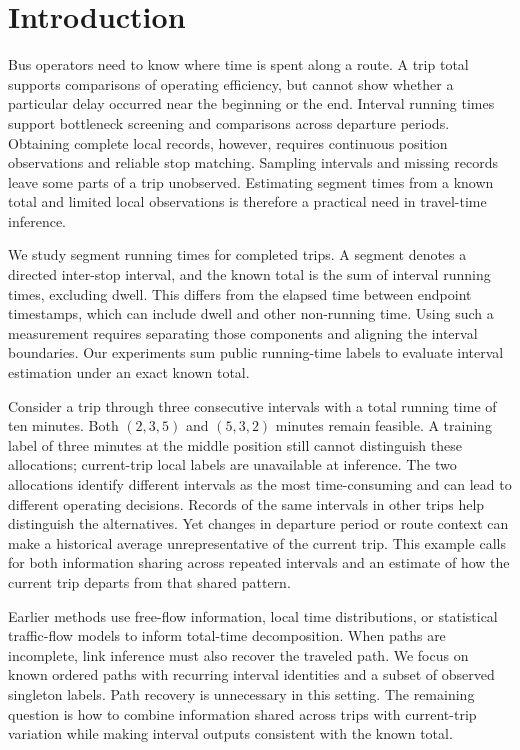 \section{Introduction}
Bus operators need to know where time is spent along a route. A trip total supports comparisons of operating efficiency, but cannot show whether a particular delay occurred near the beginning or the end. Interval running times support bottleneck screening and comparisons across departure periods. Obtaining complete local records, however, requires continuous position observations and reliable stop matching. Sampling intervals and missing records leave some parts of a trip unobserved. Estimating segment times from a known total and limited local observations is therefore a practical need in travel-time inference\cite{hellinga2008,hofleitner2011,yin2015entryexit}.

We study segment running times for completed trips. A segment denotes a directed inter-stop interval, and the known total is the sum of interval running times, excluding dwell. This differs from the elapsed time between endpoint timestamps, which can include dwell and other non-running time. Using such a measurement requires separating those components and aligning the interval boundaries. Our experiments sum public running-time labels to evaluate interval estimation under an exact known total.

Consider a trip through three consecutive intervals with a total running time of ten minutes. Both $(2,3,5)$ and $(5,3,2)$ minutes remain feasible. A training label of three minutes at the middle position still cannot distinguish these allocations; current-trip local labels are unavailable at inference. The two allocations identify different intervals as the most time-consuming and can lead to different operating decisions. Records of the same intervals in other trips help distinguish the alternatives. Yet changes in departure period or route context can make a historical average unrepresentative of the current trip. This example calls for both information sharing across repeated intervals and an estimate of how the current trip departs from that shared pattern.

Earlier methods use free-flow information, local time distributions, or statistical traffic-flow models to inform total-time decomposition\cite{hellinga2008,hofleitner2011}. When paths are incomplete, link inference must also recover the traveled path\cite{yin2015entryexit,sun2022prltte}. We focus on known ordered paths with recurring interval identities and a subset of observed singleton labels. Path recovery is unnecessary in this setting. The remaining question is how to combine information shared across trips with current-trip variation while making interval outputs consistent with the known total.

